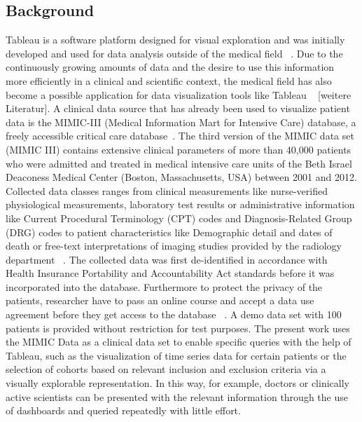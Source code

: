 \documentclass[aac,crcready]{iosart2x}
\begin{document}
\subsection{Background}\label{s1.1}
%
Tableau is a software platform designed for visual exploration and was initially developed and used for data analysis outside of the medical field ~\cite{Tableau.2021}. Due to the continuously growing amounts of data and the desire to use this information more efficiently in a clinical and scientific context, the medical field has also become a possible application for data visualization tools like Tableau ~\cite{Ko.2017} [weitere Literatur]. 
A clinical data source that has already been used to visualize patient data is the MIMIC-III (Medical Information Mart for Intensive Care) database, a freely accessible critical care database~\cite{Festag.2019,Lee.2016,Johnson.2020,Johnson.2016}. The third version of the MIMIC data set (MIMIC III) contains extensive clinical parameters of more than 40,000 patients who were admitted and treated in medical intensive care units of the Beth Israel Deaconess Medical Center (Boston, Massachusetts, USA) between 2001 and 2012. Collected data classes ranges from clinical measurements like nurse-verified physiological measurements, laboratory test results or administrative information like Current Procedural Terminology (CPT) codes and Diagnosis-Related Group (DRG) codes to patient characteristics like Demographic detail and dates of death or free-text interpretations of imaging studies provided by the radiology department ~\cite{Johnson.2020,Johnson.2016}. The collected data was first de-identified in accordance with Health Insurance Portability and Accountability Act standards before it was incorporated into the database. Furthermore to protect the privacy of the patients, researcher have to pass an online course and accept a data use agreement before they get access to the database ~\cite{Johnson.2020,Johnson.2016}. A demo data set with 100 patients is provided without restriction for test purposes. 
The present work uses the MIMIC Data as a clinical data set to enable specific queries with the help of Tableau, such as the visualization of time series data for certain patients or the selection of cohorts based on relevant inclusion and exclusion criteria via a visually explorable representation. In this way, for example, doctors or clinically active scientists can be presented with the relevant information through the use of dashboards and queried repeatedly with little effort.
\end{document}
